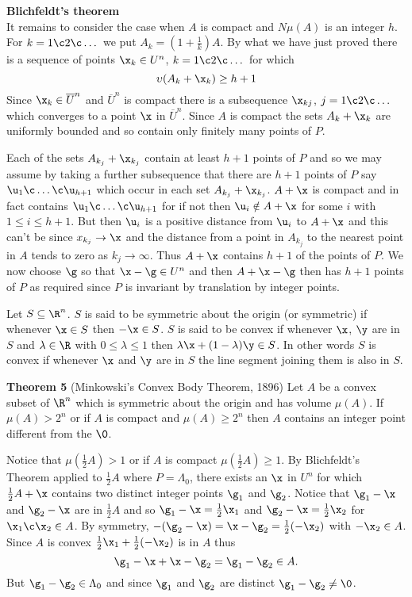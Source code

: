 \textbf{Blichfeldt's theorem} \\
It remains to consider the case when $A$ is compact and $N\mu(A)$ is an integer $h$.  For $k=1\c 2\c \dotsc$ we put $A_k=(1+\frac1k)A$.  By what we have just proved there is a sequence of points $\x_k\in U^n$, $k=1\c 2\c \dotsc$ for which
\[ \upsilon(A_k+\x_k)\geq h+1 \]
Since $\x_k\in\overline U^n$ and $\overline U^n$ is compact there is a subsequence $\x_{kj}$, $j=1\c 2\c \dotsc$ which converges to a point $\x$ in $\overline U^n$.  Since $A$ is compact the sets $A_k+\x_k$ are uniformly bounded and so contain only finitely many points of $P$.

Each of the sets $A_{k_j}+\x_{k_j}$ contain at least $h+1$ points of $P$ and so we may assume by taking a further subsequence that there are $h+1$ points of $P$ say $\u_1\c \dotsc\c \u_{h+1}$ which occur in each set $A_{k_j}+\x_{k_j}$.  $A+\x$ is compact and in fact contains $\u_1\c \dotsc\c \u_{h+1}$ for if not then $\u_i\notin A+\x$ for some $i$ with $1\leq i\leq h+1$.  But then $\u_i$ is a positive distance from $\u_i$ to $A+\x$ and this can't be since $x_{k_j}\to\x$ and the distance from a point in $A_{k_j}$ to the nearest point in $A$ tends to zero as $k_j\to\infty$.  Thus $A+\x$ contains $h+1$ of the points of $P$.  We now choose $\g$ so that $\x-\g\in U^n$ and then $A+\x-\g$ then has $h+1$ points of $P$ as required since $P$ is invariant by translation by integer points.

Let $S\subseteq\R^n$.  $S$ is said to be symmetric about the origin (or symmetric) if whenever $\x\in S$ then $-\x\in S$.  $S$ is said to be convex if whenever $\x$, $\y$ are in $S$ and $\lambda\in\R$ with $0\leq\lambda\leq1$ then $\lambda\x+(1-\lambda)\y\in S$.  In other words $S$ is convex if whenever $\x$ and $\y$ are in $S$ the line segment joining them is also in $S$.

\textbf{Theorem 5} (Minkowski's Convex Body Theorem, 1896) Let $A$ be a convex subset of $\R^n$ which is symmetric about the origin and has volume $\mu(A)$.  If $\mu(A)>2^n$ or if $A$ is compact and $\mu(A)\geq2^n$ then $A$ contains an integer point different from the $\0$.

\pf Notice that $\mu(\frac12 A)>1$ or if $A$ is compact $\mu(\frac12 A)\geq1$.  By Blichfeldt's Theorem applied to $\frac12 A$ where $P=\Lambda_0$, there exists an $\x$ in $U^n$ for which $\frac12 A+\x$ contains two distinct integer points $\g_1$ and $\g_2$.  Notice that $\g_1-\x$ and $\g_2-\x$ are in $\frac12 A$ and so $\g_1-\x=\frac12\x_1$ and $\g_2-\x=\frac12\x_2$ for $\x_1\c \x_2\in A$.  By symmetry, $-(\g_2-\x)=\x-\g_2=\frac12(-\x_2)$ with $-\x_2\in A$.  Since $A$ is convex $\frac12\x_1+\frac12(-\x_2)$ is in $A$ thus
\[ \g_1-\x + \x - \g_2 = \g_1 - \g_2 \in A . \]
But $\g_1-\g_2\in\Lambda_0$ and since $\g_1$ and $\g_2$ are distinct $\g_1-\g_2\neq\0$.

